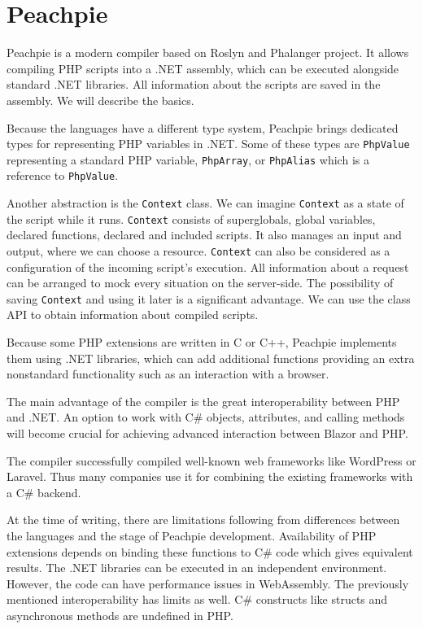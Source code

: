 \section{Peachpie}

Peachpie \cite{online:peachpie} is a modern compiler based on Roslyn and Phalanger project.
It allows compiling PHP scripts into a .NET assembly, which can be executed alongside standard .NET libraries.
All information about the scripts are saved in the assembly.
We will describe the basics.
\par
Because the languages have a different type system, Peachpie brings dedicated types for representing PHP variables in .NET.
Some of these types are \texttt{PhpValue} representing a standard PHP variable, \texttt{PhpArray}, or \texttt{PhpAlias} which is a reference to \texttt{PhpValue}.
\par
Another abstraction is the \texttt{Context} class.
We can imagine \texttt{Context} as a state of the script while it runs.
\texttt{Context} consists of superglobals, global variables, declared functions, declared and included scripts.
It also manages an input and output, where we can choose a resource.
\texttt{Context} can also be considered as a configuration of the incoming script's execution.
All information about a request can be arranged to mock every situation on the server-side.
The possibility of saving \texttt{Context} and using it later is a significant advantage.
We can use the class API to obtain information about compiled scripts.
\par
Because some PHP extensions are written in C or C++, Peachpie implements them using .NET libraries, which can add additional functions providing an extra nonstandard functionality such as an interaction with a browser.
\par
The main advantage of the compiler is the great interoperability between PHP and .NET.
An option to work with C\# objects, attributes, and calling methods will become crucial for achieving advanced interaction between Blazor and PHP.
\par
The compiler successfully compiled well-known web frameworks like WordPress or Laravel.
Thus many companies use it for combining the existing frameworks with a C\# backend.
\par
At the time of writing, there are limitations following from differences between the languages and the stage of Peachpie development.
Availability of PHP extensions depends on binding these functions to C\# code which gives equivalent results. 
The .NET libraries can be executed in an independent environment. 
However, the code can have performance issues in WebAssembly.
The previously mentioned interoperability has limits as well.
C\# constructs like structs and asynchronous methods are undefined in PHP.
